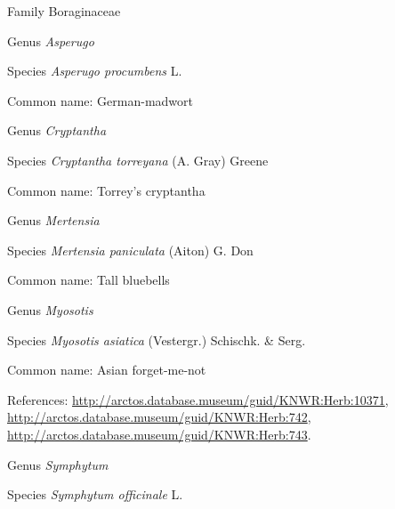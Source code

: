 \documentclass[9pt, article]{memoir}
\begin{document}
\begin{multicols}{2}
\vspace{6pt}\noindent\hspace{24pt}Family Boraginaceae


\vspace{6pt}\noindent\hspace{30pt}Genus \textit{Asperugo}


\vspace{6pt}\noindent\hspace{36pt}Species \textit{Asperugo procumbens} L.


Common name: German-madwort

\vspace{6pt}\noindent\hspace{30pt}Genus \textit{Cryptantha}


\vspace{6pt}\noindent\hspace{36pt}Species \textit{Cryptantha torreyana} (A. Gray) Greene


Common name: Torrey's cryptantha

\vspace{6pt}\noindent\hspace{30pt}Genus \textit{Mertensia}


\vspace{6pt}\noindent\hspace{36pt}Species \textit{Mertensia paniculata} (Aiton) G. Don


Common name: Tall bluebells

\vspace{6pt}\noindent\hspace{30pt}Genus \textit{Myosotis}


\vspace{6pt}\noindent\hspace{36pt}Species \textit{Myosotis asiatica} (Vestergr.) Schischk. \& Serg.


Common name: Asian forget-me-not

References: 
\url{http://arctos.database.museum/guid/KNWR:Herb:10371}, 
\url{http://arctos.database.museum/guid/KNWR:Herb:742}, 
\url{http://arctos.database.museum/guid/KNWR:Herb:743}.

\vspace{6pt}\noindent\hspace{30pt}Genus \textit{Symphytum}


\vspace{6pt}\noindent\hspace{36pt}Species \textit{Symphytum officinale} L.



\end{multicols}
\end{document}
